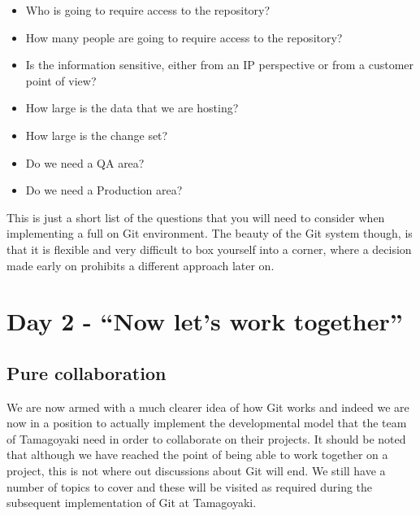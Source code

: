 \begin{itemize}
\item Who is going to require access to the repository?
\item How many people are going to require access to the repository?
\item Is the information sensitive, either from an IP perspective or from a customer point of view?
\item How large is the data that we are hosting?
\item How large is the change set?
\item Do we need a QA area?
\item Do we need a Production area?
\end{itemize}

This is just a short list of the questions that you will need to consider when implementing a full on Git environment.
The beauty of the Git system though, is that it is flexible and very difficult to box yourself into a corner, where a decision made early on prohibits a different approach later on.

\section{Day 2 - ``Now let's work together''}
\subsection{Pure collaboration}

We are now armed with a much clearer idea of how Git works and indeed we are now in a position to actually implement the developmental model that the team of Tamagoyaki need in order to collaborate on their projects.
It should be noted that although we have reached the point of being able to work together on a project, this is not where out discussions about Git will end.
We still have a number of topics to cover and these will be visited as required during the subsequent implementation of Git at Tamagoyaki.


